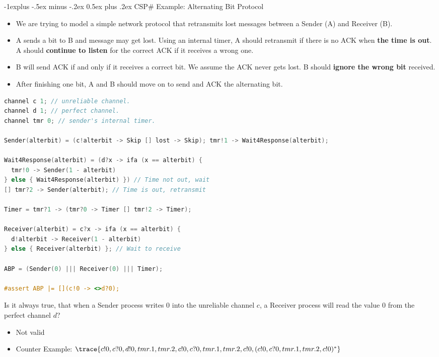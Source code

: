 \documentclass[10pt, landscape]{article}
\makeatletter
\renewcommand{\subsection}{\@startsection{subsection}{2}{0mm}%
  {-1explus -.5ex minus -.2ex}%
  {0.5ex plus .2ex}%
{\normalfont\normalsize\bfseries}}
\makeatother
\begin{document}
\begin{multicols*}{2}
  \subsection{CSP\# Example: Alternating Bit Protocol}
  \begin{itemize}
      \item We are trying to model a simple network protocol that retransmits lost messages between a Sender (A) and Receiver (B).
      \item A sends a bit to B and message may get lost. Using an internal timer, A should retransmit if there is no ACK when {\color{red} \textbf{the time is out}.} A should {\color{orange} \textbf{continue to listen}} for the correct ACK if it receives a wrong one.
      \item B will send ACK if and only if it receives a correct bit. We assume the ACK never gets lost. B should {\color{orange} \textbf{ignore the wrong bit}} received.
      \item After finishing one bit, A and B should move on to send and ACK the alternating bit.
  \end{itemize}

\begin{lstlisting}[language=C, basicstyle=\scriptsize\selectfont\ttfamily, mathescape]
channel c 1; // unreliable channel.
channel d 1; // perfect channel.
channel tmr 0; // sender's internal timer.

Sender(alterbit) = (c!alterbit -> Skip [] lost -> Skip); tmr!1 -> Wait4Response(alterbit);

Wait4Response(alterbit) = (d?x -> ifa (x == alterbit) {
  tmr!0 -> Sender(1 - alterbit)
} else { Wait4Response(alterbit) }) // Time not out, wait
[] tmr?2 -> Sender(alterbit); // Time is out, retransmit

Timer = tmr?1 -> (tmr?0 -> Timer [] tmr!2 -> Timer);

Receiver(alterbit) = c?x -> ifa (x == alterbit) {
  d!alterbit -> Receiver(1 - alterbit)
} else { Receiver(alterbit) }; // Wait to receive

ABP = (Sender(0) ||| Receiver(0) ||| Timer);

#assert ABP |= [](c!0 -> <>d?0);
\end{lstlisting}

  Is it always true, that when a Sender process writes 0 into the unreliable channel $c$, a Receiver process will read the value 0 from the perfect channel $d$?
  \begin{itemize}
    \item Not valid
    \item Counter Example: $\trace{c!0, c?0, d!0, tmr.1, tmr.2, c!0, c?0, tmr.1, tmr.2, c!0, (c!0, c?0, tmr.1, tmr.2, c!0)^{*}}$
  \end{itemize}



\end{multicols*}
\end{document}
